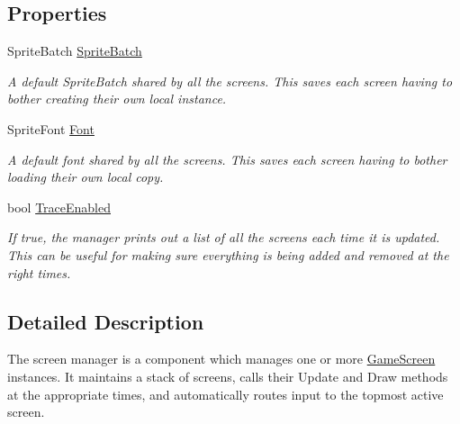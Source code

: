 \subsection*{Properties}
\begin{DoxyCompactItemize}
\item 
SpriteBatch \hyperlink{classCityMania_1_1TEMP_1_1ScreenManager_a89dc251770c88ab602b89b7d30d5da69}{SpriteBatch}
\begin{DoxyCompactList}\small\item\em A default SpriteBatch shared by all the screens. This saves each screen having to bother creating their own local instance. \item\end{DoxyCompactList}\item 
SpriteFont \hyperlink{classCityMania_1_1TEMP_1_1ScreenManager_a50897fc0fe5df9097d558c2e94f5adb7}{Font}
\begin{DoxyCompactList}\small\item\em A default font shared by all the screens. This saves each screen having to bother loading their own local copy. \item\end{DoxyCompactList}\item 
bool \hyperlink{classCityMania_1_1TEMP_1_1ScreenManager_ab060ac0c95c465e6f41757a6f0ca1be8}{TraceEnabled}
\begin{DoxyCompactList}\small\item\em If true, the manager prints out a list of all the screens each time it is updated. This can be useful for making sure everything is being added and removed at the right times. \item\end{DoxyCompactList}\end{DoxyCompactItemize}


\subsection{Detailed Description}
The screen manager is a component which manages one or more \hyperlink{classCityMania_1_1GameScreen}{GameScreen} instances. It maintains a stack of screens, calls their Update and Draw methods at the appropriate times, and automatically routes input to the topmost active screen. 

